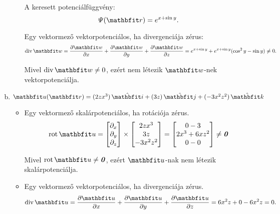 \documentclass{szb-solution}
\begin{document}
\begin{enumerate}[a)]
\begin{itemize}
                A keresett potenciálfüggvény:
                $$
                  \varPsi(\coordvec)
                  =
                  e^{x + \sin y}
                  \text.
                $$

                Egy vektormező vektorpotenciálos, ha divergenciája zérus:
                $$
                  \Div \rvec w
                  =
                  \pdv{\rvec w}{x} + \pdv{\rvec w}{y} + \pdv{\rvec w}{z}
                  =
                  e^{x + \sin y} + e^{x + \sin y}(\cos^2 y - \sin y)
                  \neq 0
                  \text.
                $$

                Mivel $\Div \rvec w \neq 0$, ezért nem létezik $\rvec w$-nek
                vektorpotenciálja.
        \end{itemize}

  \item $\rvec u(\coordvec) = \ijk{2zx^3}{3z}{-3x^2z^2}$
        \begin{itemize}
          \item Egy vektormező skalárpotenciálos, ha rotációja zérus.
                $$
                  \rot \rvec u
                  =
                  \begin{bmatrix}
                    \partial_x \\ \partial_y \\ \partial_z
                  \end{bmatrix}
                  \times
                  \begin{bmatrix}
                    2zx^3 \\ 3z \\ -3x^2z^2
                  \end{bmatrix}
                  =
                  \begin{bmatrix}
                    0 - 3           \\
                    2 x^3 + 6 x z^2 \\
                    0 - 0
                  \end{bmatrix}
                  \neq
                  \nvec
                $$

                Mivel $\rot \rvec u \neq \nvec$, ezért $\rvec u$-nak nem
                létezik skalárpotenciálja.

          \item Egy vektormező vektorpotenciálos, ha divergenciája zérus.
                $$
                  \Div \rvec u
                  =
                  \pdv{\rvec u}{x} + \pdv{\rvec u}{y} + \pdv{\rvec u}{z}
                  =
                  6 x^2 z + 0 -6 x^2 z
                  =
                  0
                  \text.
                $$


\end{itemize}
\end{enumerate}
\end{document}
